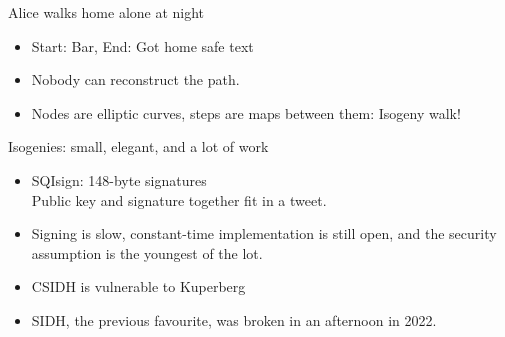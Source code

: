\documentclass[aspectratio=169,handout]{beamer}
\begin{document}
          \begin{frame}{Alice walks home alone at night}
            \centering
            \vfill
            \begin{itemize}
              \item Start: Bar, End: Got home safe text \pause
              \item \alert{Nobody can reconstruct the path.}\pause
              \item Nodes are elliptic curves, steps are maps between them\pause :
                Isogeny walk!
            \end{itemize}
          \end{frame}


          \begin{frame}{Isogenies: small, elegant, and a lot of work}
            \begin{itemize}
              \item SQIsign: 148-byte signatures \\ \pause Public key and signature together fit in a
                tweet. \pause
              \item Signing is slow, \pause constant-time implementation is still
                open, \pause and the security assumption is the youngest of the lot.\pause
              \item CSIDH is vulnerable to Kuperberg \pause
              \item SIDH, the previous favourite, was broken in an afternoon in
                2022.
            \end{itemize}
          \end{frame}
\end{document}
